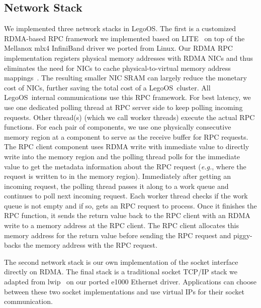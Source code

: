 \documentclass[10pt,times,twocolumn]{z2-article}
\newcommand{\eg}{\textit{e.g.}}
\newcommand{\lego}{LegoOS}
\providecommand{\DIFdelend}{} %
\DeclareRobustCommand{\DIFdelend}{\DIFOaddend \let\includegraphics\DIFOincludegraphics} %
\begin{document}
{{{{{{{%
\DIFdelend \subsection{Network Stack}
We implemented three network stacks in \lego.
The first is a customized RDMA-based RPC framework we implemented based on LITE~\cite{Tsai17-SOSP}
on top of the Mellanox mlx4 InfiniBand driver we ported from Linux.
Our RDMA RPC implementation registers physical memory addresses with RDMA NICs 
and thus eliminates the need for NICs to cache physical-to-virtual memory address mappings~\cite{Tsai17-SOSP}.
The resulting smaller NIC SRAM can largely reduce the monetary cost of NICs,
further saving the total cost of a \lego\ cluster. %
All \lego\ internal communications use this RPC framework.
For best latency, we use one dedicated polling thread at RPC server side to keep polling incoming requests.
Other thread(s) (which we call worker threads) execute the actual RPC functions. 
For each pair of components, we use one physically consecutive memory region at a component
to serve as the receive buffer for RPC requests. 
The RPC client component uses RDMA write with immediate value to directly write 
into the memory region and the polling thread polls for the immediate value to get the metadata 
information about the RPC request (\eg, where the request is written to in the memory region).
Immediately after getting an incoming request, the polling thread passes it along to a 
work queue and continues to poll next incoming request.
Each worker thread checks if the work queue is not empty and if so, gets an RPC request 
to process. Once it finishes the RPC function, it sends the return value back to the RPC client 
with an RDMA write to a memory address at the RPC client.
The RPC client allocates this memory address for the return value before sending the RPC request
and piggy-backs the memory address with the RPC request.

The second network stack is our own implementation of the socket interface directly on RDMA.
The final stack is a traditional socket TCP/IP stack we adapted from lwip~\cite{lwip} 
on our ported e1000 Ethernet driver.
Applications can choose between these two socket implementations 
and use virtual IPs for their socket communication.

}}}}}}}
\end{document}
